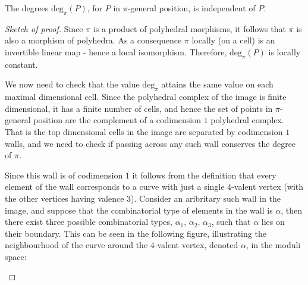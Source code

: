 \begin{proposition}
    The degrees $\text{deg}_{\pi}(P)$, for $P$ in $\pi$-general position, is independent of $P$.
\end{proposition}
\begin{proof}[Sketch of proof]
    Since $\pi$ is a product of polyhedral morphisms, it follows that $\pi$ is also a morphism of polyhedra.
    As a consequence $\pi$ locally (on a cell) is an invertible linear map - hence a local isomorphism. 
    Therefore, $\text{deg}_{\pi}(P)$ is locally constant.
    \par We now need to check that the value $\text{deg}_{\pi}$ attains the same value on each maximal dimensional cell. 
    Since the polyhedral complex of the image is finite dimensional, it has a finite number of cells, and hence the set of points in $\pi$-general position are the complement of a codimension $1$ polyhedral complex. 
    That is the top dimensional cells in the image are separated by codimension $1$ walls, and we need to check if passing across any such wall conserves the degree of $\pi$.
    \par Since this wall is of codimension $1$ it follows from the definition that every element of the wall corresponds to a curve with just a single $4$-valent vertex (with the other vertices having valence $3$). 
    Consider an aribritary such wall in the image, and suppose that the combinatorial type of elements in the wall is $\alpha$, then there exist three possible combinatorial types, $\alpha_{1},\, \alpha_{2},\,\alpha_{3}$, such that $\alpha$ lies on their boundary.
    This can be seen in the following figure, illustrating the neighbourhood of the curve around the $4$-valent vertex, denoted $\alpha$, in the moduli space:
    \begin{figure}[h]
        \centering
\end{figure}
\end{proof}
